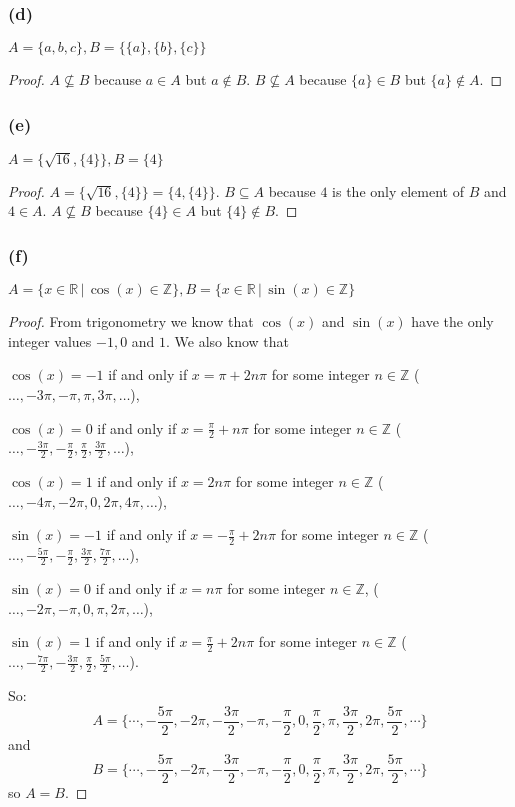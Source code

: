 \documentclass[14pt]{extarticle}
\newcommand{\R}{\mathbb{R}}
\newcommand{\Z}{\mathbb{Z}}
\begin{document}
\subsubsection{(d)}
\(A = \{a, b, c\}, B = \{\{a\}, \{b\}, \{c\}\}\)

\begin{proof}
  \(A \nsubseteq B\) because $a \in A$ but $a \notin B$.
  \(B \nsubseteq A\) because $\{a\} \in B$ but $\{a\} \notin A$.
\end{proof}

\subsubsection{(e)}
\(A = \{\sqrt{16}, \{4\}\}, B = \{4\}\)

\begin{proof}
  \(A = \{\sqrt{16}, \{4\}\} = \{4, \{4\}\}\).
  \(B \subseteq A\) because $4$ is the only element of $B$ and $4 \in A$.
  \(A \nsubseteq B\) because \(\{4\} \in A\) but \(\{4\} \notin B\).
\end{proof}

\subsubsection{(f)}
\(A = \{x \in \R \, | \, \cos(x) \in \Z\}, B = \{x \in \R \, | \, \sin(x) \in \Z\}\)

\begin{proof}
  From trigonometry we know that \(\cos(x)\) and \(\sin(x)\) have the only integer values $-1, 0$ and $1$. We also know that

  \(\cos(x) = -1\) if and only if \(x = \pi + 2n\pi\) for some integer $n \in \Z$
  (\(\ldots, -3\pi, -\pi, \pi, 3\pi, \ldots\)),

  \(\cos(x) = 0\) if and only if \(x = \frac{\pi}{2} + n\pi\) for some integer $n \in \Z$
  (\(\ldots, -\frac{3\pi}{2}, -\frac{\pi}{2}, \frac{\pi}{2}, \frac{3\pi}{2}, \ldots\)),

  \(\cos(x) = 1\) if and only if \(x = 2n\pi\) for some integer $n \in \Z$
  (\(\ldots, -4\pi, -2\pi, 0, 2\pi, 4\pi, \ldots\)),

  \(\sin(x) = -1\) if and only if \(x = -\frac{\pi}{2} + 2n\pi\) for some integer $n \in \Z$
  (\(\ldots, -\frac{5\pi}{2}, -\frac{\pi}{2}, \frac{3\pi}{2}, \frac{7\pi}{2}, \ldots\)),

  \(\sin(x) = 0\) if and only if \(x = n\pi\) for some integer $n \in \Z$,
  (\(\ldots, -2\pi, -\pi, 0, \pi, 2\pi, \ldots\)),

  \(\sin(x) = 1\) if and only if \(x = \frac{\pi}{2} + 2n\pi\) for some integer $n \in \Z$
  (\(\ldots, -\frac{7\pi}{2}, -\frac{3\pi}{2}, \frac{\pi}{2}, \frac{5\pi}{2}, \ldots\)).

  So:
  \[
    A = \{\cdots, -\frac{5\pi}{2}, -2\pi, -\frac{3\pi}{2}, -\pi, -\frac{\pi}{2}, 0, \frac{\pi}{2}, \pi, \frac{3\pi}{2}, 2\pi, \frac{5\pi}{2}, \cdots\}
  \]
  and
  \[
    B = \{\cdots, -\frac{5\pi}{2}, -2\pi, -\frac{3\pi}{2}, -\pi, -\frac{\pi}{2}, 0, \frac{\pi}{2}, \pi, \frac{3\pi}{2}, 2\pi, \frac{5\pi}{2}, \cdots\}
  \]
  so $A = B$.
\end{proof}
\end{document}
